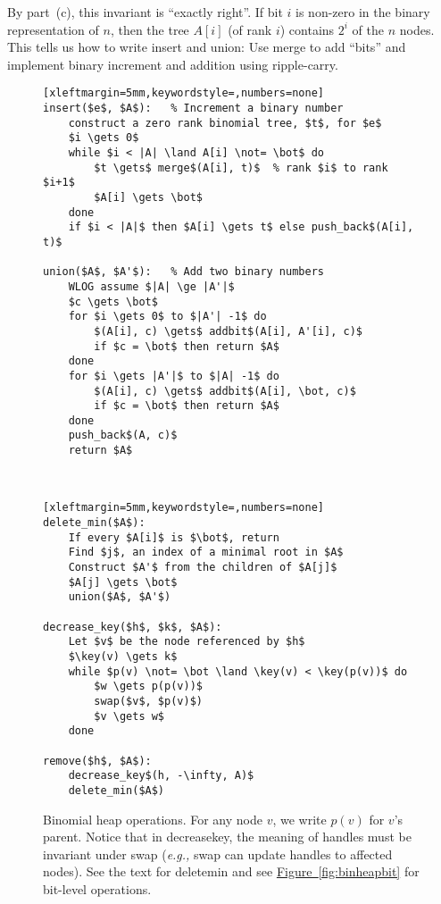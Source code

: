 \documentclass[a4paper]{article}
\DeclareMathOperator{\key}{key}
\newcommand{\any}{{\rule[-.2ex]{1ex}{.4pt}}}	%
\newcommand{\eg}{\emph{e.g.,} }
\newcommand*{\figref}[1]{\hyperref[#1]{Figure~\ref*{#1}}}
\begin{document}
By part~(c), this invariant is ``exactly right''.
If bit $i$ is non-zero in the binary representation of $n$, then the tree $A[i]$ (of rank $i$) contains $2^i$ of the $n$ nodes.
This tells us how to write insert and union:
Use merge to add ``bits'' and implement binary increment and addition using ripple-carry.

\begin{figure}
\begin{minipage}{0.49\textwidth}
\begin{lstlisting}[xleftmargin=5mm,keywordstyle=,numbers=none]
insert($e$, $A$):	% Increment a binary number
	construct a zero rank binomial tree, $t$, for $e$
	$i \gets 0$
	while $i < |A| \land A[i] \not= \bot$ do
		$t \gets$ merge$(A[i], t)$	% rank $i$ to rank $i+1$
		$A[i] \gets \bot$
	done
	if $i < |A|$ then $A[i] \gets t$ else push_back$(A[i], t)$

union($A$, $A'$):	% Add two binary numbers
	WLOG assume $|A| \ge |A'|$
	$c \gets \bot$
	for $i \gets 0$ to $|A'| -1$ do
		$(A[i], c) \gets$ addbit$(A[i], A'[i], c)$
		if $c = \bot$ then return $A$
	done
	for $i \gets |A'|$ to $|A| -1$ do
		$(A[i], c) \gets$ addbit$(A[i], \bot, c)$
		if $c = \bot$ then return $A$
	done
	push_back$(A, c)$
	return $A$
\end{lstlisting}
\end{minipage}
~~\vrule~~
\begin{minipage}{0.49\textwidth}
\begin{lstlisting}[xleftmargin=5mm,keywordstyle=,numbers=none]
delete_min($A$):
	If every $A[i]$ is $\bot$, return
	Find $j$, an index of a minimal root in $A$
	Construct $A'$ from the children of $A[j]$
	$A[j] \gets \bot$
	union($A$, $A'$)

decrease_key($h$, $k$, $A$):
	Let $v$ be the node referenced by $h$
	$\key(v) \gets k$
	while $p(v) \not= \bot \land \key(v) < \key(p(v))$ do
		$w \gets p(p(v))$
		swap($v$, $p(v)$)
		$v \gets w$
	done

remove($h$, $A$):
	decrease_key$(h, -\infty, A)$
	delete_min($A$)
\end{lstlisting}
\end{minipage}
\caption{%
	Binomial heap operations.
	For any node $v$, we write $p(v)$ for $v$'s parent.
	Notice that in decrease\protect\any{}key, the meaning of handles must be invariant under swap (\eg swap can update handles to affected nodes).
	See the text for delete\protect\any{}min and see \figref{fig:binheapbit} for bit-level operations.
}
\label{fig:binheap}
\end{figure}
\end{document}
